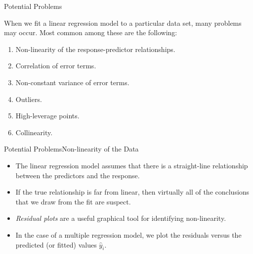 \begin{frame}{Potential Problems}

When we fit a linear regression model to a particular data set, many problems may occur. Most common among these are the following:


\begin{enumerate}
    \item<1-2> Non-linearity of the response-predictor relationships.
    \item<1> Correlation of error terms.
    \item<1> Non-constant variance of error terms.
    \item<1> Outliers.
    \item<1> High-leverage points.
    \item<1> Collinearity.
\end{enumerate}
    
\end{frame}

\begin{frame}{Potential Problems}{Non-linearity of the Data}

    
\begin{itemize}
    \item The linear regression model assumes that there is a straight-line relationship between the predictors and the response. \pause
    
    \item If the true relationship is far from linear, then virtually all of the conclusions that we draw from the fit are suspect. \pause

    \item \textit{Residual plots} are a useful graphical tool for identifying non-linearity. 

    \item In the case of a multiple regression model, we plot the residuals versus the predicted (or fitted) values $\hat{y}_i$. 


    \end{itemize}

\end{frame}

